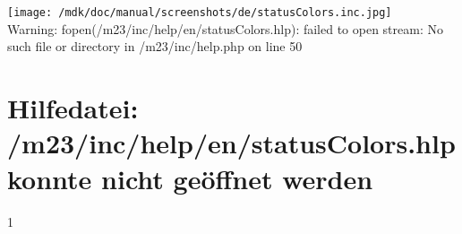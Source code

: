 \section{}
\texttt{[image: /mdk/doc/manual/screenshots/de/statusColors.inc.jpg]} \\
 Warning: fopen(/m23/inc/help/en/statusColors.hlp): failed to open stream: No such file or directory in /m23/inc/help.php on line 50 \section{Hilfedatei: /m23/inc/help/en/statusColors.hlp konnte nicht ge\"offnet werden}
1 

